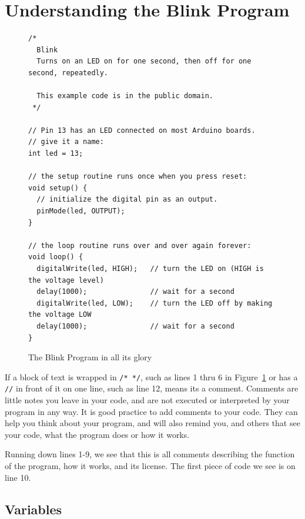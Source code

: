 \documentclass[11pt,a4paper]{article}
\begin{document}


\section{Understanding the Blink Program} %
\label{sec:understanding_the_blink_program}

\begin{figure}[htbp]
	\centering
\begin{verbatim}
/*
  Blink
  Turns on an LED on for one second, then off for one second, repeatedly.
 
  This example code is in the public domain.
 */
 
// Pin 13 has an LED connected on most Arduino boards.
// give it a name:
int led = 13;

// the setup routine runs once when you press reset:
void setup() {                
  // initialize the digital pin as an output.
  pinMode(led, OUTPUT);     
}

// the loop routine runs over and over again forever:
void loop() {
  digitalWrite(led, HIGH);   // turn the LED on (HIGH is the voltage level)
  delay(1000);               // wait for a second
  digitalWrite(led, LOW);    // turn the LED off by making the voltage LOW
  delay(1000);               // wait for a second
}
\end{verbatim}
	\caption{The Blink Program in all its glory}
	\label{fig:blink}
\end{figure}

If a block of text is wrapped in \texttt{/* */}, such as lines 1 thru 6 in Figure~\ref{fig:blink} or has a \texttt{//} in front of it on one line, such as line 12, means its a comment.  Comments are little notes you leave in your code, and are not executed or interpreted by your program in any way.  It is good practice to add comments to your code.  They can help you think about your program, and will also remind you, and others that see your code, what the program does or how it works.


Running down lines 1-9, we see that this is all comments describing the function of the program, how it works, and its license.   The first piece of code we see is on line 10.


\subsection{Variables} %
\label{sub:variables}
\end{document}
